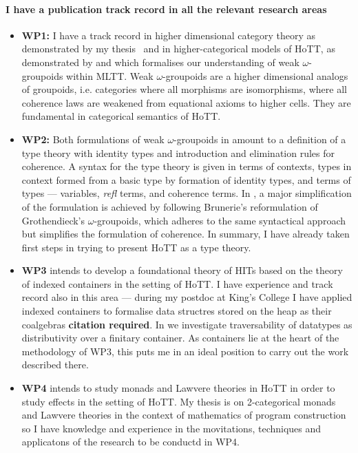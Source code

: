 \documentclass[a4paper]{article}
\newcommand{\mltt}{MLTT}
\begin{document}
\paragraph{I have a publication track record in all the relevant research areas}
\begin{itemize}
\item {\bf WP1:} I have a track record in higher dimensional category
  theory as demonstrated by my thesis~\cite{RypacekThesis} and in
  higher-categorical models of HoTT, as demonstrated by
   and 
  which formalises our understanding of weak $\omega$-groupoids within
  \mltt. Weak $\omega$-groupoids are a higher dimensional analogs of
  groupoids, i.e. categories where all morphisms are isomorphisms,
  where all coherence laws are weakened from equational axioms to
  higher cells. They are fundamental in categorical semantics of HoTT.

\item {\bf WP2:} Both formulations of weak $\omega$-groupoids in
   amount to a
  definition of a type theory with identity types and introduction and
  elimination rules for coherence. A syntax for the type theory is
  given in terms of contexts, types in context formed from a basic
  type by formation of identity types, and terms of types ---
  variables, \emph{refl} terms, and coherence terms. In
  , a major simplification of the
  formulation is achieved by following Brunerie's reformulation of
  Grothendieck's $\omega$-groupoids, which adheres to the same
  syntactical approach but simplifies the formulation of coherence. In
  summary, I have already taken first steps in trying to present HoTT
  as a type theory.

\item {\bf WP3} intends to develop a foundational theory of HITs based
  on the theory of indexed containers in the setting of HoTT. I have
  experience and track record also in this area --- during my postdoc
  at King's College I have applied indexed containers to formalise
  data structres stored on the heap as their coalgebras {\bf citation required}. In
   we investigate traversability of
  datatypes as distributivity over a finitary container. As containers
  lie at the heart of the methodology of WP3, this puts me in an ideal
  position to carry out the work described there. 

\item {\bf WP4} intends to study monads and Lawvere theories in HoTT
  in order to study effects in the setting of HoTT.  My thesis
   is on 2-categorical monads and Lawvere
  theories in the context of mathematics of program construction so I
  have knowledge and experience in the movitations, techniques and
  applicatons of the research to be conductd in WP4.
\end{itemize}
\end{document}
